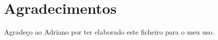 \chapter*{Agradecimentos}
\setlength{\parskip}{1em}

Agradeço ao Adriano por ter elaborado este ficheiro para o meu uso.

\setlength{\parskip}{0em}